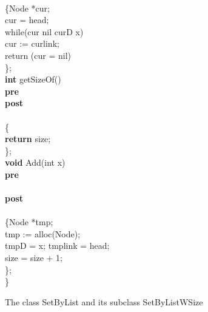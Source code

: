 \documentclass[fleqn]{llncs}
\begin{document}
\begin{figure}
\begin{center}
\begin{boxedminipage}{0.5\textwidth}
{\begin{tabbing}
    \>  \>  \>\\
    \>\{\>Node *cur;\\
    \>  \>  cur = head;\\
    \>  \>  while(cur  nil  cur\fldacc D  x)\\
    \>  \>  \>cur := cur\fldacc link;\\
    \>  \>return (cur = nil)\\
    \>\};\\
    \>\textbf{int}  getSizeOf()\\
    \>  \>\textbf{pre} \\
    \>  \>\textbf{post} \\
    \>  \>  \>\\
    \>\{\\
    \>  \>\textbf{return} size;\\
    \>\};\\
    \>\textbf{void} Add(int x)\\
    \>  \>\textbf{pre} \\
    \>  \>  \>\\
    \>  \>\textbf{post} \\
    \>  \>  \>\\
    \>\{\>Node *tmp;\\
    \>  \>tmp := alloc(Node); \\
    \>  \>tmp\fldacc D = x; tmp\fldacc link = head;\\
    \>  \>size = size + 1;\\
    \>\};\\
\}
\end{tabbing}
}
\end{boxedminipage}

\end{center}
\caption{The class SetByList and its subclass SetByListWSize}\label{FIG-INHERITENCE}
\end{figure}
\end{document}
